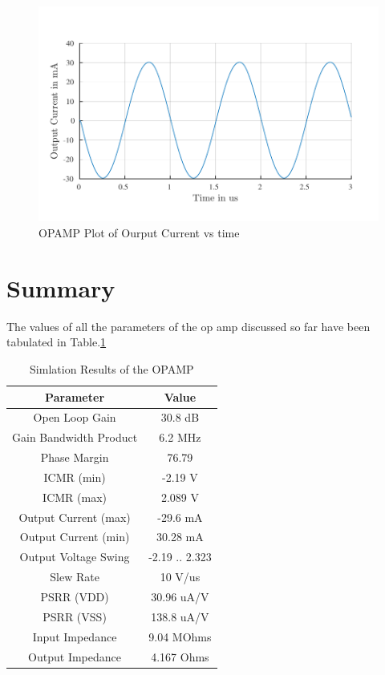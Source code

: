 \begin{figure} [H]
\centering
\includegraphics[scale=1]{Figures/Plots/OPAMP_Iout.pdf}
\caption{OPAMP Plot of Ourput Current vs time}
\label{fig:OPAMP_Iout}
\end{figure}

\section{Summary}

The values of all the parameters of the op amp discussed so far have been tabulated in Table.\ref{tab:OPAMP_Results}
\begin{table} [H]
\centering
\begin{tabular}{@{}cc@{}}
\toprule
Parameter					& Value				\\ \midrule
Open Loop Gain				& 30.8 dB			\\
Gain Bandwidth Product		& 6.2 MHz			\\
Phase Margin				& 76.79				\\
ICMR (min)					& -2.19 V			\\
ICMR (max)					& 2.089 V			\\
Output Current (max)		& -29.6 mA			\\
Output Current (min)		& 30.28 mA			\\
Output Voltage Swing		& -2.19 .. 2.323 	\\
Slew Rate					& 10 V/us			\\
PSRR (VDD)					& 30.96 uA/V		\\
PSRR (VSS)					& 138.8 uA/V		\\
Input Impedance				& 9.04 MOhms		\\
Output Impedance			& 4.167 Ohms		\\
\bottomrule
\end{tabular}
\caption{Simlation Results of the OPAMP}
\label{tab:OPAMP_Results}
\end{table}